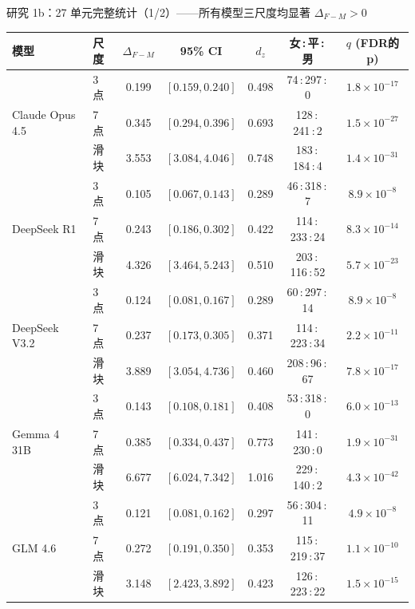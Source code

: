 \documentclass[aspectratio=169,professionalfonts]{beamer}
\begin{document}
\begin{frame}{研究 1b：27 单元完整统计（1/2）——所有模型三尺度均显著 $\Delta_{F-M}>0$}
  \scriptsize
  \setlength{\tabcolsep}{3pt}
  \renewcommand{\arraystretch}{0.9}
  \begin{table}
    \centering
    \begin{tabular}{llccccc}
      \toprule
      模型 & 尺度 & $\Delta_{F-M}$ & 95\% CI & $d_z$ & 女\,:\,平\,:\,男 & $q$ (FDR的p) \\
      \midrule
      \multirow{3}{*}{Claude Opus 4.5}
        & 3 点    & 0.199 & $[0.159, 0.240]$ & 0.498 & 74\,:\,297\,:\,0   & $1.8\!\times\!10^{-17}$ \\
        & 7 点    & 0.345 & $[0.294, 0.396]$ & 0.693 & 128\,:\,241\,:\,2  & $1.5\!\times\!10^{-27}$ \\
        & 滑块    & 3.553 & $[3.084, 4.046]$ & 0.748 & 183\,:\,184\,:\,4  & $1.4\!\times\!10^{-31}$ \\
      \midrule
      \multirow{3}{*}{DeepSeek R1}
        & 3 点    & 0.105 & $[0.067, 0.143]$ & 0.289 & 46\,:\,318\,:\,7   & $8.9\!\times\!10^{-8}$ \\
        & 7 点    & 0.243 & $[0.186, 0.302]$ & 0.422 & 114\,:\,233\,:\,24 & $8.3\!\times\!10^{-14}$ \\
        & 滑块    & 4.326 & $[3.464, 5.243]$ & 0.510 & 203\,:\,116\,:\,52 & $5.7\!\times\!10^{-23}$ \\
      \midrule
      \multirow{3}{*}{DeepSeek V3.2}
        & 3 点    & 0.124 & $[0.081, 0.167]$ & 0.289 & 60\,:\,297\,:\,14  & $8.9\!\times\!10^{-8}$ \\
        & 7 点    & 0.237 & $[0.173, 0.305]$ & 0.371 & 114\,:\,223\,:\,34 & $2.2\!\times\!10^{-11}$ \\
        & 滑块    & 3.889 & $[3.054, 4.736]$ & 0.460 & 208\,:\,96\,:\,67  & $7.8\!\times\!10^{-17}$ \\
      \midrule
      \multirow{3}{*}{Gemma 4 31B}
        & 3 点    & 0.143 & $[0.108, 0.181]$ & 0.408 & 53\,:\,318\,:\,0   & $6.0\!\times\!10^{-13}$ \\
        & 7 点    & 0.385 & $[0.334, 0.437]$ & 0.773 & 141\,:\,230\,:\,0  & $1.9\!\times\!10^{-31}$ \\
        & 滑块    & 6.677 & $[6.024, 7.342]$ & 1.016 & 229\,:\,140\,:\,2  & $4.3\!\times\!10^{-42}$ \\
      \midrule
      \multirow{3}{*}{GLM 4.6}
        & 3 点    & 0.121 & $[0.081, 0.162]$ & 0.297 & 56\,:\,304\,:\,11  & $4.9\!\times\!10^{-8}$ \\
        & 7 点    & 0.272 & $[0.191, 0.350]$ & 0.353 & 115\,:\,219\,:\,37 & $1.1\!\times\!10^{-10}$ \\
        & 滑块    & 3.148 & $[2.423, 3.892]$ & 0.423 & 126\,:\,223\,:\,22 & $1.5\!\times\!10^{-15}$ \\
      \bottomrule
    \end{tabular}
  \end{table}
\end{frame}
\end{document}

